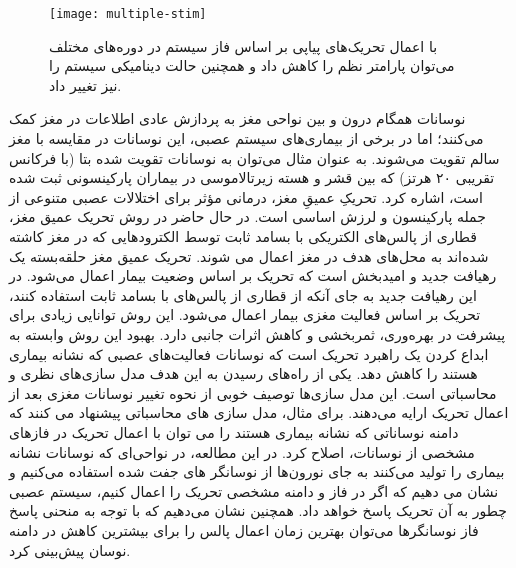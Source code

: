 \begin{figure}
	\centering
	\texttt{[image: multiple-stim]}
    \caption{
با اعمال تحریک‌های پیاپی بر اساس فاز سیستم در دوره‌های مختلف می‌توان پارامتر نظم را کاهش داد و همچنین حالت دینامیکی سیستم را نیز تغییر داد.
    }
\end{figure}

نوسانات همگام درون و بین نواحی مغز به پردازش عادی اطلاعات در مغز کمک می‌کنند؛ اما در برخی از بیماری‌های سیستم عصبی، این نوسانات در مقایسه با مغز سالم تقویت می‌شوند. به عنوان مثال می‌توان به نوسانات تقویت شده بتا (با فرکانس تقریبی ۲۰ هرتز) که بین قشر و هسته زیرتالاموسی در بیماران پارکینسونی ثبت شده است، اشاره کرد. تحریکِ عمیقِ مغز، درمانی مؤثر برای اختلالات عصبی متنوعی از جمله پارکینسون و لرزش اساسی است. در حال حاضر در روش تحریک عمیق مغز، قطاری از پالس‌های الکتریکی با بسامد ثابت توسط الکترود‌هایی که در مغز کاشته شده‌اند به محل‌های هدف در مغز اعمال می شوند.  تحریک عمیق مغز حلقه‌بسته یک رهیافت جدید و  امید‌بخش است که تحریک بر اساس وضعیت بیمار اعمال می‌شود. در این رهیافت جدید به جای آنکه از قطاری از پالس‌های با بسامد ثابت استفاده کنند، تحریک بر اساس فعالیت مغزی بیمار اعمال می‌شود.  این روش توانایی زیادی برای پیشرفت در بهره‌وری، ثمربخشی و کاهش اثرات جانبی دارد. بهبود این روش وابسته به ابداع کردن یک راهبرد تحریک است که نوسانات فعالیت‌های عصبی که نشانه بیماری هستند را کاهش دهد. یکی از راه‌های رسیدن به این هدف مدل سازی‌های نظری و محاسباتی است. این مدل سازی‌ها توصیف خوبی از نحوه تغییر نوسانات مغزی بعد از اعمال تحریک ارایه می‌دهند. برای مثال، مدل سازی های محاسباتی پیشنهاد می کنند که دامنه نوساناتی که نشانه بیماری هستند را می توان با اعمال تحریک در فازهای مشخصی از نوسانات، اصلاح کرد. در این مطالعه، در نواحی‌ای که نوسانات نشانه بیماری را تولید می‌کنند به جای نورون‌ها از نوسانگر های جفت شده استفاده می‌کنیم و نشان می دهیم که اگر در فاز و دامنه مشخصی تحریک را اعمال کنیم، سیستم عصبی چطور به آن تحریک پاسخ خواهد داد. همچنین نشان می‌دهیم که با توجه به منحنی پاسخ فاز نوسانگرها می‌توان بهترین زمان اعمال پالس را برای بیشترین کاهش در دامنه نوسان پیش‌بینی کرد.